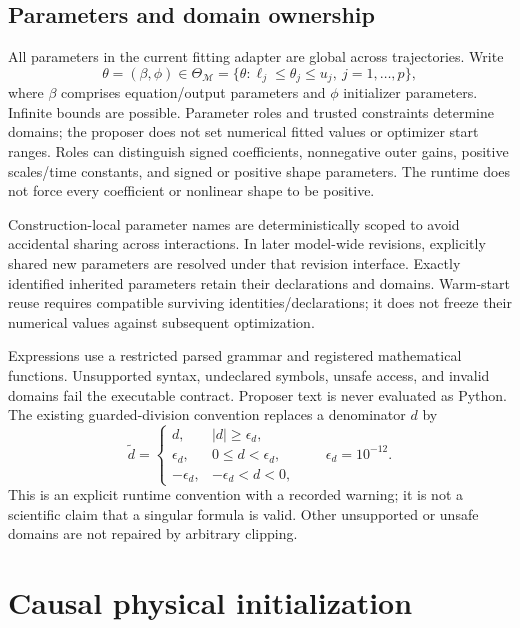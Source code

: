 \documentclass[11pt]{article}
\newcommand{\M}{\mathcal{M}}
\begin{document}
\subsection{Parameters and domain ownership}
All parameters in the current fitting adapter are global across trajectories.
Write
\begin{equation}
 \theta=(\beta,\phi)\in\Theta_{\M}
   =\{\theta:\ell_j\leq\theta_j\leq u_j,\ j=1,\ldots,p\},
\end{equation}
where $\beta$ comprises equation/output parameters and $\phi$ initializer
parameters. Infinite bounds are possible. Parameter roles and trusted constraints
determine domains; the proposer does not set numerical fitted values or optimizer
start ranges. Roles can distinguish signed coefficients, nonnegative outer gains,
positive scales/time constants, and signed or positive shape parameters. The
runtime does not force every coefficient or nonlinear shape to be positive.

Construction-local parameter names are deterministically scoped to avoid
accidental sharing across interactions. In later model-wide revisions, explicitly
shared new parameters are resolved under that revision interface. Exactly
identified inherited parameters retain their declarations and domains. Warm-start
reuse requires compatible surviving identities/declarations; it does not freeze
their numerical values against subsequent optimization.

Expressions use a restricted parsed grammar and registered mathematical
functions. Unsupported syntax, undeclared symbols, unsafe access, and invalid
domains fail the executable contract. Proposer text is never evaluated as Python.
The existing guarded-division convention replaces a denominator $d$ by
\begin{equation}
 \widetilde d=\begin{cases}
 d,&|d|\geq\epsilon_d,\\
 \epsilon_d,&0\leq d<\epsilon_d,\\
 -\epsilon_d,&-\epsilon_d<d<0,
 \end{cases}\qquad \epsilon_d=10^{-12}.
\end{equation}
This is an explicit runtime convention with a recorded warning; it is not a
scientific claim that a singular formula is valid. Other unsupported or unsafe
domains are not repaired by arbitrary clipping.

\section{Causal physical initialization}
\label{sec:initialization}
\end{document}
